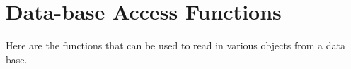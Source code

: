 \section{Data-base Access Functions} 

Here are the functions that can be used to read in various objects
from a data base.







